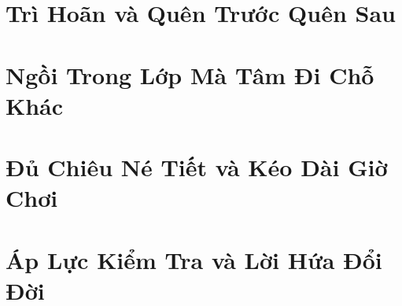 \documentclass[12pt,a4paper,oneside,openany]{book}
\begin{document}
\part{Trì Hoãn và Quên Trước Quên Sau}










\part{Ngồi Trong Lớp Mà Tâm Đi Chỗ Khác}










\part{Đủ Chiêu Né Tiết và Kéo Dài Giờ Chơi}










\part{Áp Lực Kiểm Tra và Lời Hứa Đổi Đời}










\end{document}
